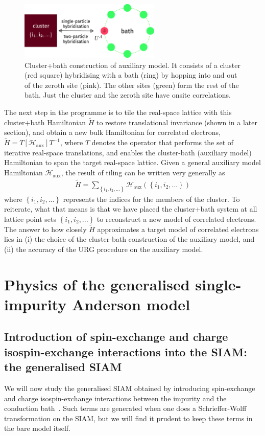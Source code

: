 \documentclass[10pt]{report}
\numberwithin{equation}{section}
\begin{document}
\begin{figure}[htpb]
 	\centering
 	\includegraphics[width=0.6\textwidth]{../figures/gen_siam.pdf}
 	\caption{Cluster+bath construction of auxiliary model. It consists of a cluster (red square) hybridising with a bath (ring) by hopping into and out of the zeroth site (pink). The other sites (green) form the rest of the bath. Just the cluster and the zeroth site have onsite correlations.}
 \end{figure}
 The next step in the programme is to tile the real-space lattice with this cluster+bath Hamiltonian \(\tilde H\) to restore translational invariance (shown in a later section), and obtain a new bulk Hamiltonian for correlated electrons, $\tilde H = T\left[ \mathcal{H}_\text{aux} \right] T^{-1}$, where $T$ denotes the operator that performs the set of iterative real-space translations, and enables the cluster-bath (auxiliary model) Hamiltonian to span the target real-space lattice. Given a general auxiliary model Hamiltonian \(\mathcal{H}_\text{aux}\), the result of tiling can be written very generally as
 \begin{equation}\begin{aligned}
	 \tilde H = \sum_{\left\{i_1,i_2,...\right\}} \mathcal{H}_\text{aux}\left(\left\{i_1,i_2,...\right\}\right)
 \end{aligned}\end{equation}
where \(\left\{i_1,i_2,...\right\}\) represents the indices for the members of the cluster. To reiterate, what that means is that we have placed the cluster+bath system at all lattice point sets \(\left\{i_1,i_2,...\right\}\) to reconstruct a new model of correlated electrons. The answer to how closely $\tilde H$ approximates a target model of correlated electrons lies in (i) the choice of the cluster-bath construction of the auxiliary model, and (ii) the accuracy of the URG procedure on the auxiliary model. 


\chapter{Physics of the generalised single-impurity Anderson model}
\label{chap:urg1}
\section{Introduction of spin-exchange and charge isospin-exchange interactions into the SIAM: the generalised SIAM}
We will now study the generalised SIAM obtained by introducing spin-exchange and charge isospin-exchange interactions between the impurity and the conduction bath~\cite{zitko_2006}. Such terms are generated when one does a Schrieffer-Wolff transformation on the SIAM, but we will find it prudent to keep these terms in the bare model itself.
\end{document}
